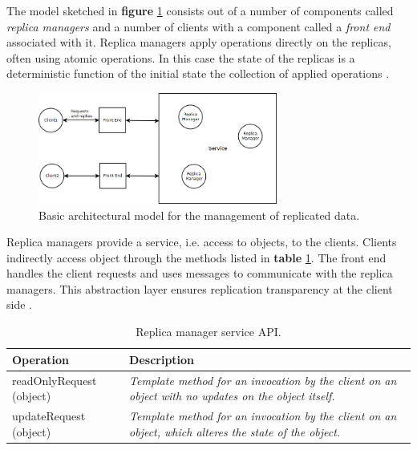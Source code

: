 The model sketched in \textbf{figure} \ref{fig:replicationmodel} consists out of a number of components called \emph{replica managers} and a number of clients with a component called a \emph{front end} associated with it. Replica managers apply operations directly on the replicas, often using atomic operations. In this case the state of the replicas is a deterministic function of the initial state the collection of applied operations \cite{Coulouris:2011:DSC:2029110}.

\begin{figure}[h]
	\begin{center}
		\includegraphics[width=0.7\textwidth]{img/systems-and-architectures/replicationmodel}
	\end{center}
	\caption{Basic architectural model for the management of replicated data.}
	\label{fig:replicationmodel}
\end{figure}



Replica managers provide a service, i.e. access to objects, to the clients. Clients indirectly access object through the methods listed in \textbf{table} \ref{tab:api:replica-manager}. The front end handles the client requests and uses messages to communicate with the replica managers. This abstraction layer ensures replication transparency at the client side \cite{Coulouris:2011:DSC:2029110}.


\begin{table}[h]
	\caption{Replica manager service API.}
	\label{tab:api:replica-manager}
	\begin{tabular}{p{150px} | p{250px}}
		\textbf{Operation} & \textbf{Description} \\
		\hline
		readOnlyRequest (object) & \emph{Template method for an invocation by the client on an object with no updates on the object itself.} \\
		updateRequest (object) & \emph{Template method for an invocation by the client on an object, which alteres the state of the object.} \\
		\hline
	\end{tabular}
\end{table}

